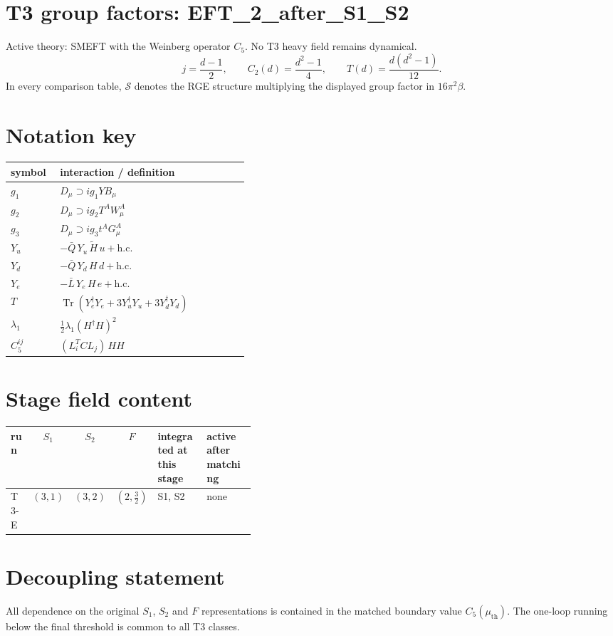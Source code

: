 \documentclass[9pt]{article}
\begin{document}
\section*{T3 group factors: EFT\_2\_after\_S1\_S2}
Active theory: SMEFT with the Weinberg operator $C_5$.  No T3 heavy field remains dynamical.
\[j=\frac{d-1}{2},\qquad C_2(d)=\frac{d^2-1}{4},\qquad T(d)=\frac{d(d^2-1)}{12}.\]
In every comparison table, $\mathcal{S}$ denotes the RGE structure multiplying the displayed group factor in $16\pi^2\beta$.
\section*{Notation key}
\begin{longtable}{@{}p{0.19\linewidth}p{0.73\linewidth}@{}}
\toprule
symbol & interaction / definition \\
\midrule
$g_1$ & $D_\mu\supset i g_1 Y B_\mu$ \\
$g_2$ & $D_\mu\supset i g_2 T^A W_\mu^A$ \\
$g_3$ & $D_\mu\supset i g_3 t^A G_\mu^A$ \\
$Y_u$ & $-\bar Q\,Y_u\,\widetilde H\,u+\mathrm{h.c.}$ \\
$Y_d$ & $-\bar Q\,Y_d\,H\,d+\mathrm{h.c.}$ \\
$Y_e$ & $-\bar L\,Y_e\,H\,e+\mathrm{h.c.}$ \\
$T$ & $\operatorname{Tr}\!\left(Y_e^\dagger Y_e+3Y_u^\dagger Y_u+3Y_d^\dagger Y_d\right)$ \\
$\lambda_1$ & $\frac12\lambda_1(H^\dagger H)^2$ \\
$C_5^{ij}$ & $(L_i^T C L_j)\,H H$ \\
\bottomrule
\end{longtable}
\section*{Stage field content}
\begin{longtable}{@{}lccc p{0.20\linewidth}p{0.20\linewidth}@{}}
\toprule
run & $S_1$ & $S_2$ & $F$ & integrated at this stage & active after matching \\
\midrule
T3-E & $(3,1)$ & $(3,2)$ & $(2,\frac{3}{2})$ & S1, S2 & none \\
\bottomrule
\end{longtable}
\section*{Decoupling statement}
All dependence on the original $S_1$, $S_2$ and $F$ representations is contained in the matched boundary value $C_5(\mu_{\mathrm{th}})$.  The one-loop running below the final threshold is common to all T3 classes.
\end{document}
